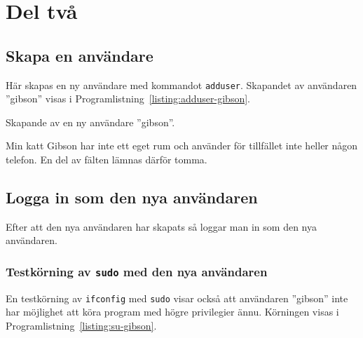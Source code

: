 %
%
%


\section{Del två}


\subsection{Skapa en användare}
Här skapas en ny användare med kommandot \texttt{adduser}.  Skapandet av
användaren ''gibson'' visas i Programlistning~\ref{listing:adduser-gibson}.

\begin{listing}[H]
\caption{Skapande av en ny användare ''gibson''.}
\label{listing:adduser-gibson}
\end{listing}

Min katt Gibson har inte ett eget rum och använder för tillfället inte heller
någon telefon. En del av fälten lämnas därför tomma.


\subsection{Logga in som den nya användaren}
Efter att den nya användaren har skapats så loggar man in som den nya
användaren.  

\subsubsection{Testkörning av \texttt{sudo} med den nya användaren}
En testkörning av \texttt{ifconfig} med \texttt{sudo} visar också
att användaren ''gibson'' inte har möjlighet att köra program med högre
privilegier ännu. Körningen visas i Programlistning~\ref{listing:su-gibson}.

